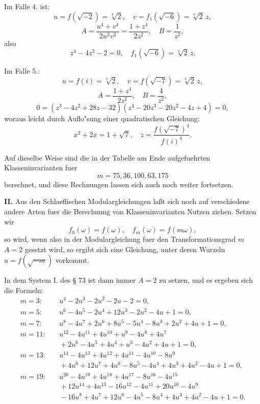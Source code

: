 \documentclass[12pt,a4paper]{article}
\theoremstyle{plain}
\theoremstyle{definition}
\theoremstyle{remark}
\begin{document}
Im Falle 4. ist:
\[
u = f(\sqrt{-2}) = \sqrt[4]{2}, \quad v = f_1(\sqrt{-6}) = \sqrt[4]{2}\, z,
\]
\[
A = \frac{u^4 + v^4}{2u^2 v^2} = \frac{1 + z^4}{2z^2}, \quad B = \frac{1}{z^2},
\]
also
\begin{equation}\label{eq:130_6}
z^4 - 4z^2 - 2 = 0, \quad f_1(\sqrt{-6}) = \sqrt[4]{2}\, z.
\end{equation}

Im Falle 5.:
\[
u = f(i) = \sqrt[4]{2}, \quad v = f(\sqrt{-7}) = \sqrt[4]{2}\, z,
\]
\[
A = \frac{1 + z^4}{2z^2}, \quad B = \frac{4}{z^2},
\]
\[
0 = (z^3 - 4z^2 + 28z - 32)(z^4 - 20z^3 - 20z^2 - 4z + 4) = 0,
\]
woraus leicht durch Auflo"sung einer quadratischen Gleichung:
\begin{equation}\label{eq:130_10}
x^2 + 2x = 1 + \sqrt{7}, \quad z = \frac{f(\sqrt{-7})^4}{f(i)^4}.
\end{equation}

\newpage

Auf dieselbe Weise sind die in der Tabelle am Ende aufgefuehrten Klasseninvarianten fuer
\[
m = 75, 36, 100, 63, 175
\]
berechnet, und diese Rechnungen lassen sich auch noch weiter fortsetzen.

\textbf{II.} Aus den Schlaeflischen Modulargleichungen la\ss{}t sich noch auf verschiedene andere Arten fuer die Berechnung von Klasseninvarianten Nutzen ziehen. Setzen wir
\begin{equation}\label{eq:130_11}
f_0(\omega) = f(\omega), \quad f_m(\omega) = f(m\omega),
\end{equation}
so wird, wenn also in der Modulargleichung fuer den Transformationsgrad $m$ $A = 2$ gesetzt wird, so ergibt sich eine Gleichung, unter deren Wurzeln $u = f(\sqrt{-m})$ vorkommt.

In dem System I. des \S{} 73 ist dann immer $A = 2$ zu setzen, und es ergeben sich die Formeln:
\begin{align*}
m = 3: & \quad u^4 - 2u^3 - 2u^2 - 2u - 2 = 0, \\
m = 5: & \quad u^6 - 4u^5 - 2u^4 + 12u^3 - 2u^2 - 4u + 1 = 0, \\
m = 7: & \quad u^8 - 4u^7 + 2u^6 + 8u^5 - 5u^4 - 8u^3 + 2u^2 + 4u + 1 = 0, \\
m = 11: & \quad u^{12} - 4u^{11} + 4u^{10} + u^9 - 4u^8 + 4u^7 \\
         & \quad + 2u^6 - 4u^5 + 4u^4 + u^3 - 4u^2 + 4u + 1 = 0, \\
m = 13: & \quad u^{14} - 4u^{13} + 4u^{12} + 4u^{11} - 4u^{10} - 8u^9 \\
         & \quad + 4u^8 + 12u^7 + 4u^6 - 8u^5 - 4u^4 + 4u^3 + 4u^2 - 4u + 1 = 0, \\
m = 19: & \quad u^{20} - 4u^{19} + 4u^{18} + 4u^{17} - 8u^{16} - 4u^{15} \\
         & \quad + 12u^{14} + 4u^{13} - 16u^{12} - 4u^{11} + 20u^{10} - 4u^9 \\
         & \quad - 16u^8 + 4u^7 + 12u^6 - 4u^5 - 8u^4 + 4u^3 + 4u^2 - 4u + 1 = 0.
\end{align*}
\end{document}
